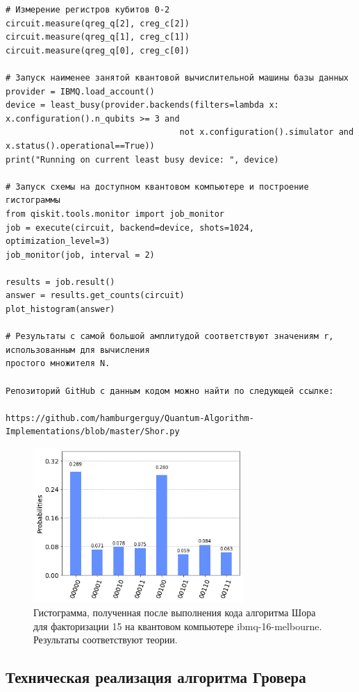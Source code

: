 \documentclass{mrl}
\begin{document}
\begin{verbatim}
# Измерение регистров кубитов 0-2
circuit.measure(qreg_q[2], creg_c[2])
circuit.measure(qreg_q[1], creg_c[1])
circuit.measure(qreg_q[0], creg_c[0])

# Запуск наименее занятой квантовой вычислительной машины базы данных
provider = IBMQ.load_account()
device = least_busy(provider.backends(filters=lambda x: x.configuration().n_qubits >= 3 and 
                                   not x.configuration().simulator and x.status().operational==True))
print("Running on current least busy device: ", device)

# Запуск схемы на доступном квантовом компьютере и построение гистограммы
from qiskit.tools.monitor import job_monitor
job = execute(circuit, backend=device, shots=1024, optimization_level=3)
job_monitor(job, interval = 2)

results = job.result()
answer = results.get_counts(circuit)
plot_histogram(answer)

# Результаты с самой большой амплитудой соответствуют значениям r, использованным для вычисления
простого множителя N. 

Репозиторий GitHub с данным кодом можно найти по следующей ссылке:

https://github.com/hamburgerguy/Quantum-Algorithm-Implementations/blob/master/Shor.py

\end{verbatim}
\break 

\begin{figure}
    \centering
    \includegraphics[width=8cm]{Shor11.png}
    \caption{Гистограмма, полученная после выполнения кода алгоритма Шора для факторизации 15 на квантовом компьютере ibmq-16-melbourne. Результаты соответствуют теории.}
    \label{fig:Shors_output}
\end{figure}

\break 

\subsection{Техническая реализация алгоритма Гровера}\label{appsec:grovers}
\end{document}
